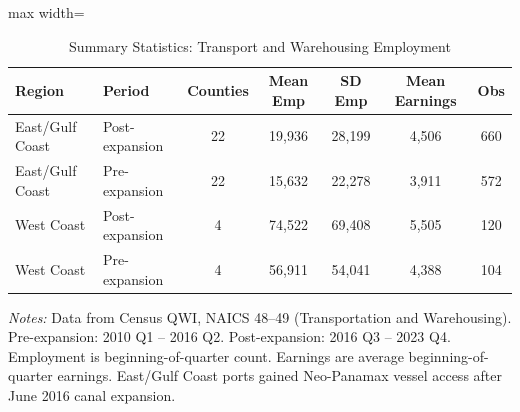 \begin{table}[htbp]
\centering
\caption{Summary Statistics: Transport and Warehousing Employment}
\label{tab:summary}
\begin{adjustbox}{max width=\textwidth}
\begin{tabular}{llccccc}
\hline\hline
Region & Period & Counties & Mean Emp & SD Emp & Mean Earnings & Obs \\
\hline
East/Gulf Coast & Post-expansion & 22 & 19,936 & 28,199 & 4,506 & 660 \\
East/Gulf Coast & Pre-expansion & 22 & 15,632 & 22,278 & 3,911 & 572 \\
West Coast & Post-expansion & 4 & 74,522 & 69,408 & 5,505 & 120 \\
West Coast & Pre-expansion & 4 & 56,911 & 54,041 & 4,388 & 104 \\
\hline\hline
\end{tabular}
\end{adjustbox}
\begin{tablenotes}[flushleft]
\small
\item \textit{Notes:} Data from Census QWI, NAICS 48--49 (Transportation and Warehousing). Pre-expansion: 2010 Q1 -- 2016 Q2. Post-expansion: 2016 Q3 -- 2023 Q4. Employment is beginning-of-quarter count. Earnings are average beginning-of-quarter earnings. East/Gulf Coast ports gained Neo-Panamax vessel access after June 2016 canal expansion.
\end{tablenotes}
\end{table}

